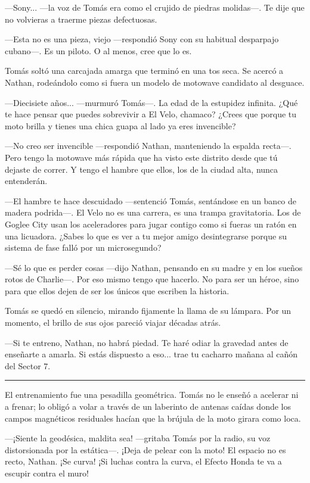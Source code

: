 \documentclass[12pt,a4paper]{book}
\begin{document}
---Sony... ---la voz de Tomás era como el crujido de piedras molidas---. Te dije que no volvieras a traerme piezas defectuosas.

---Esta no es una pieza, viejo ---respondió Sony con su habitual desparpajo cubano---. Es un piloto. O al menos, cree que lo es.

Tomás soltó una carcajada amarga que terminó en una tos seca. Se acercó a Nathan, rodeándolo como si fuera un modelo de motowave candidato al desguace.

---Diecisiete años... ---murmuró Tomás---. La edad de la estupidez infinita. ¿Qué te hace pensar que puedes sobrevivir a El Velo, chamaco? ¿Crees que porque tu moto brilla y tienes una chica guapa al lado ya eres invencible?

---No creo ser invencible ---respondió Nathan, manteniendo la espalda recta---. Pero tengo la motowave más rápida que ha visto este distrito desde que tú dejaste de correr. Y tengo el hambre que ellos, los de la ciudad alta, nunca entenderán.

---El hambre te hace descuidado ---sentenció Tomás, sentándose en un banco de madera podrida---. El Velo no es una carrera, es una trampa gravitatoria. Los de Goglee City usan los aceleradores para jugar contigo como si fueras un ratón en una licuadora. ¿Sabes lo que es ver a tu mejor amigo desintegrarse porque su sistema de fase falló por un microsegundo?

---Sé lo que es perder cosas ---dijo Nathan, pensando en su madre y en los sueños rotos de Charlie---. Por eso mismo tengo que hacerlo. No para ser un héroe, sino para que ellos dejen de ser los únicos que escriben la historia.

Tomás se quedó en silencio, mirando fijamente la llama de su lámpara. Por un momento, el brillo de sus ojos pareció viajar décadas atrás.

---Si te entreno, Nathan, no habrá piedad. Te haré odiar la gravedad antes de enseñarte a amarla. Si estás dispuesto a eso... trae tu cacharro mañana al cañón del Sector 7.

\bigskip
\noindent\rule{\textwidth}{0.4pt}
\bigskip

El entrenamiento fue una pesadilla geométrica. Tomás no le enseñó a acelerar ni a frenar; lo obligó a volar a través de un laberinto de antenas caídas donde los campos magnéticos residuales hacían que la brújula de la moto girara como loca.

---¡Siente la geodésica, maldita sea! ---gritaba Tomás por la radio, su voz distorsionada por la estática---. ¡Deja de pelear con la moto! El espacio no es recto, Nathan. ¡Se curva! ¡Si luchas contra la curva, el Efecto Honda te va a escupir contra el muro!
\end{document}
